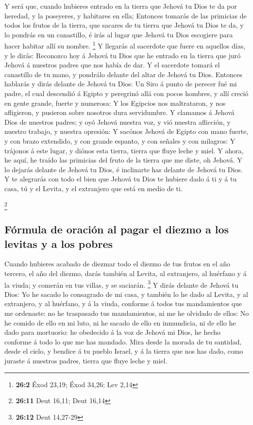  Y será que, cuando hubieres entrado en la tierra que
Jehová tu Dios te da por heredad, y la poseyeres, y habitares en ella;
 Entonces tomarás de las primicias de todos los frutos de
la tierra, que sacares de tu tierra que Jehová tu Dios te da, y lo
pondrás en un canastillo, é irás al lugar que Jehová tu Dios escogiere
para hacer habitar allí su nombre. \footnote{\textbf{26:2} Éxod 23,19;
  Éxod 34,26; Lev 2,14}  Y llegarás al sacerdote que fuere
en aquellos días, y le dirás: Reconozco hoy á Jehová tu Dios que he
entrado en la tierra que juró Jehová á nuestros padres que nos había de
dar.  Y el sacerdote tomará el canastillo de tu mano, y
pondrálo delante del altar de Jehová tu Dios.  Entonces
hablarás y dirás delante de Jehová tu Dios: Un Siro á punto de perecer
fué mi padre, el cual descendió á Egipto y peregrinó allá con pocos
hombres, y allí creció en gente grande, fuerte y numerosa:
 Y los Egipcios nos maltrataron, y nos afligieron, y
pusieron sobre nosotros dura servidumbre.  Y clamamos á
Jehová Dios de nuestros padres; y oyó Jehová nuestra voz, y vió nuestra
aflicción, y nuestro trabajo, y nuestra opresión:  Y
sacónos Jehová de Egipto con mano fuerte, y con brazo extendido, y con
grande espanto, y con señales y con milagros:  Y trájonos
á este lugar, y diónos esta tierra, tierra que fluye leche y miel.
 Y ahora, he aquí, he traído las primicias del fruto de
la tierra que me diste, oh Jehová. Y lo dejarás delante de Jehová tu
Dios, é inclinarte has delante de Jehová tu Dios.  Y te
alegrarás con todo el bien que Jehová tu Dios te hubiere dado á ti y á
tu casa, tú y el Levita, y el extranjero que está en medio de ti.

\footnote{\textbf{26:11} Deut 16,11; Deut 16,14}

\hypertarget{fuxf3rmula-de-oraciuxf3n-al-pagar-el-diezmo-a-los-levitas-y-a-los-pobres}{%
\subsection{Fórmula de oración al pagar el diezmo a los levitas y a los
pobres}\label{fuxf3rmula-de-oraciuxf3n-al-pagar-el-diezmo-a-los-levitas-y-a-los-pobres}}

 Cuando hubieres acabado de diezmar todo el diezmo de tus
frutos en el año tercero, el año del diezmo, darás también al Levita, al
extranjero, al huérfano y á la viuda; y comerán en tus villas, y se
saciarán. \footnote{\textbf{26:12} Deut 14,27-29}  Y
dirás delante de Jehová tu Dios: Yo he sacado lo consagrado de mi casa,
y también lo he dado al Levita, y al extranjero, y al huérfano, y á la
viuda, conforme á todos tus mandamientos que me ordenaste: no he
traspasado tus mandamientos, ni me he olvidado de ellos: 
No he comido de ello en mi luto, ni he sacado de ello en inmundicia, ni
de ello he dado para mortuorio: he obedecido á la voz de Jehová mi Dios,
he hecho conforme á todo lo que me has mandado.  Mira
desde la morada de tu santidad, desde el cielo, y bendice á tu pueblo
Israel, y á la tierra que nos has dado, como juraste á nuestros padres,
tierra que fluye leche y miel.

